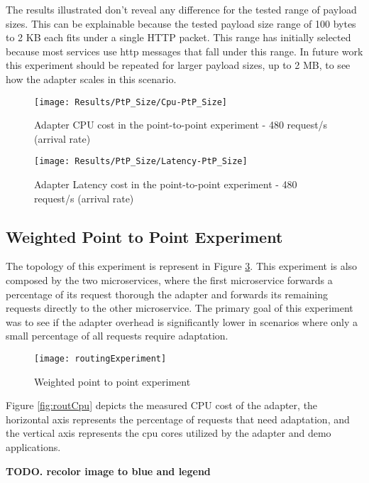 The results illustrated don't reveal any difference for the tested range of payload sizes.
This can be explainable because the tested payload size range of 100 bytes to 2 KB each fits under a single HTTP packet.
This range has initially selected because most services use http messages that fall under this range.
In future work this experiment should be repeated for larger payload sizes, up to 2 MB, to see how the adapter scales in this scenario.

\begin{figure}[htbp]
    \centering
    \texttt{[image: Results/PtP\_Size/Cpu-PtP\_Size]}
    \caption{Adapter CPU cost in the point-to-point experiment - 480 request/s (arrival rate)}
    \label{fig:payloadCpuPtP}
\end{figure}

\begin{figure}[htbp]
    \centering
    \texttt{[image: Results/PtP\_Size/Latency-PtP\_Size]}
    \caption{Adapter Latency cost in the point-to-point experiment - 480 request/s (arrival rate)}
    \label{fig:payloadLatPtP}
\end{figure}

\subsection{Weighted Point to Point Experiment}

The topology of this experiment is represent in Figure \ref{fig:routExp}.
This experiment is also composed by the two microservices, where the first microservice forwards a percentage of its request thorough the adapter
and forwards its remaining requests directly to the other microservice.
The primary goal of this experiment was to see if the adapter overhead is significantly lower in scenarios where only a small percentage of all requests require adaptation.

\begin{figure}[htbp]
    \centering
    \texttt{[image: routingExperiment]}
    \caption{Weighted point to point experiment}
    \label{fig:routExp}
\end{figure}

Figure \ref{fig:routCpu} depicts the measured CPU cost of the adapter, the horizontal axis represents the percentage of requests that need adaptation, and the vertical axis represents the
cpu cores utilized by the adapter and demo applications.

\textbf{TODO. recolor image to blue and legend}

